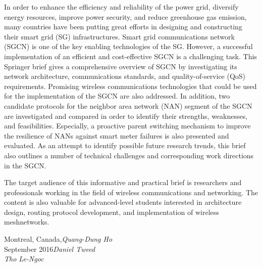 %
%

\preface

In order to enhance the efficiency and reliability of the power grid, diversify energy resources, improve power security, and reduce greenhouse gas emission, many countries have been putting great efforts in designing and constructing their smart grid (SG) infrastructures. Smart grid communications network (SGCN) is one of the key enabling technologies of the SG. However, a successful implementation of an efficient and cost-effective SGCN is a challenging task. This Springer brief gives a comprehensive overview of SGCN by investigating its network architecture, communications standards, and quality-of-service (QoS) requirements. Promising wireless communications technologies that could be used for the implementation of the SGCN are also addressed. In addition, two candidate protocols for the neighbor area network (NAN) segment of the SGCN are investigated and compared in order to identify their strengths, weaknesses, and feasibilities. Especially, a proactive parent switching mechanism to improve the resilience of NANs against smart meter failures is also presented and evaluated. As an attempt to identify possible future research trends, this brief also outlines a number of technical challenges and corresponding work directions in the SGCN.

The target audience of this informative and practical brief is researchers and professionals working in the field of wireless communications and networking. The content is also valuable for advanced-level students interested in architecture design, routing protocol development, and implementation of wireless meshnetworks.

\vspace{\baselineskip}
\begin{flushright}\noindent
Montreal, Canada,\hfill {\it Quang-Dung Ho}\\
September 2016\hfill {\it Daniel Tweed}\\
\hfill {\it Tho Le-Ngoc}\\
\end{flushright}